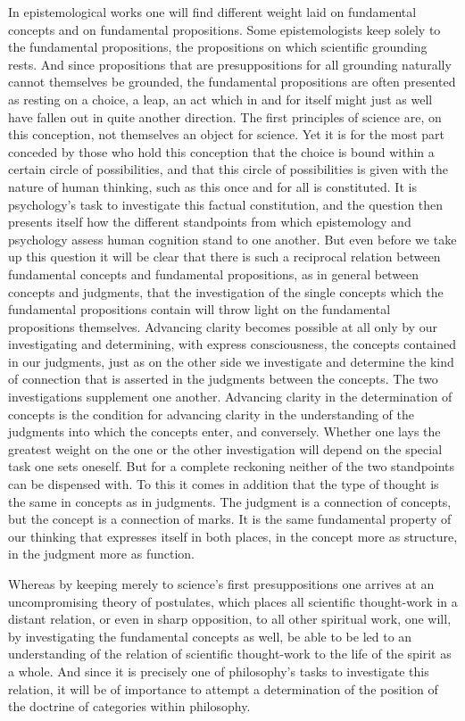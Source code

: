 \documentclass[12pt]{book}
\newcommand{\opage}[1]{\marginnote{\footnotesize\textit{[#1]}}}
\begin{document}
In epistemological works one will find different weight laid on fundamental
concepts and on fundamental propositions. Some epistemologists keep solely to
the fundamental propositions, the propositions on which scientific grounding
rests. And since propositions that are presuppositions for all grounding
naturally cannot themselves be grounded, the fundamental propositions are often
presented as resting on a choice, a leap, an act which in and for itself might
just as well have fallen out in quite another direction. The first principles of
science are, on this conception, not themselves an object for science. Yet it is
for the most part conceded by those who hold this conception that the choice is
bound within a certain circle of possibilities, and that this circle of
possibilities is given with the nature of human thinking, such as this once and
for all is constituted. It is psychology's task to investigate this factual
constitution, and the question then presents itself how the different
standpoints from which epistemology and psychology assess human cognition \opage{4}stand
to one another. But even before we take up this question it will be clear that
there is such a reciprocal relation between fundamental concepts and fundamental
propositions, as in general between concepts and judgments, that the
investigation of the single concepts which the fundamental propositions contain
will throw light on the fundamental propositions themselves. Advancing clarity
becomes possible at all only by our investigating and determining, with express
consciousness, the concepts contained in our judgments, just as on the other
side we investigate and determine the kind of connection that is asserted in the
judgments between the concepts. The two investigations supplement one another.
Advancing clarity in the determination of concepts is the condition for
advancing clarity in the understanding of the judgments into which the concepts
enter, and conversely. Whether one lays the greatest weight on the one or the
other investigation will depend on the special task one sets oneself. But for a
complete reckoning neither of the two standpoints can be dispensed with. To this
it comes in addition that the type of thought is the same in concepts as in
judgments. The judgment is a connection of concepts, but the concept is a
connection of marks. It is the same fundamental property of our thinking that
expresses itself in both places, in the concept more as structure, in the
judgment more as function.

Whereas by keeping merely to science's first presuppositions one arrives at an
uncompromising theory of postulates, which places all scientific thought-work in
a distant relation, or even in sharp opposition, to all other spiritual work,
one will, by investigating the fundamental concepts as well, be able to be led
to an understanding of the relation of scientific thought-work to the life of
the spirit as a whole. And since it is precisely one of philosophy's tasks to
investigate this relation, it will be of importance to attempt a determination
of the position of the doctrine of categories within philosophy.
\end{document}
